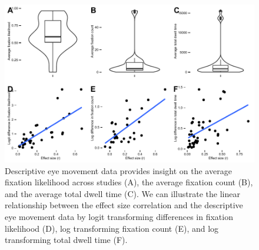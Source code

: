 \begin{figure}[!h]
\includegraphics{figs/EMtoES.pdf}
\centering
\caption{Descriptive eye movement data provides insight on the average fixation likelihood across studies (A), the average fixation count (B), and the average total dwell time (C). We can illustrate the linear relationship between the effect size correlation and the descriptive eye movement data by logit transforming differences in fixation likelihood (D), log transforming fixation count (E), and log transforming total dwell time (F).}
\label{fig:em_figure}
\end{figure}

